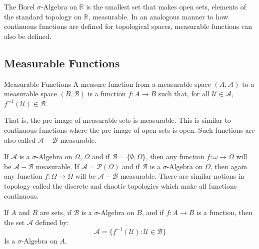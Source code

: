         The Borel $\sigma\text{-Algebra}$ on $\mathbb{R}$ is the
        smallest set that makes open sets, elements of the standard
        topology on $\mathbb{R}$, measurable. In an analogous manner
        to how continuous functions are defined for topological
        spaces, measurable functions can also be defined.
    \subsection{Measurable Functions}
        \begin{ldefinition}{Measurable Functions}
            A measure function from a measurable space
            $(A,\mathcal{A})$ to a measurable space
            $(B,\mathcal{B})$ is a function $f:A\rightarrow{B}$
            such that, for all $\mathcal{U}\in\mathcal{A}$,
            $f^{-1}(\mathcal{U})\in\mathcal{B}$.
        \end{ldefinition}
        That is, the pre-image of measurable sets is measurable.
        This is similar to continuous functions where the pre-image
        of open sets is open. Such functions are also called
        $\mathcal{A}-\mathcal{B}$ measurable.
        \begin{lexample}
            If $\mathcal{A}$ is a $\sigma\text{-Algebra}$ on $\Omega$,
            $\Omega$ and if $\mathcal{B}=\{\emptyset,\Omega\}$,
            then any function $f:\omega\rightarrow\Omega$ will be
            $\mathcal{A}-\mathcal{B}$ measurable. If
            $\mathcal{A}=\mathcal{P}(\Omega)$ and if
            $\mathcal{B}$ is a $\sigma\text{-Algebra}$ on $\Omega$,
            then again any function $f:\Omega\rightarrow\Omega$ will
            be $\mathcal{A}-\mathcal{B}$ measurable. There are similar
            notions in topology called the discrete and chaotic
            topologies which make all functions continuous.
        \end{lexample}
        \begin{theorem}
            If $A$ and $B$ are sets, if $\mathcal{B}$ is a
            $\sigma\text{-Algebra}$ on $B$, and if $f:A\rightarrow{B}$
            is a function, then the set $\mathcal{A}$ defined by:
            \begin{equation}
                \mathcal{A}=
                \{f^{-1}(\mathcal{U}):\mathcal{U}\in\mathcal{B}\}
            \end{equation}
            Is a $\sigma\text{-Algebra}$ on $A$.
        \end{theorem}
